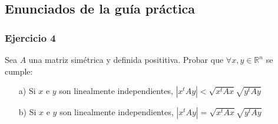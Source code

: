 \subsection{Enunciados de la guía práctica}\label{subsec:enunciados_guia_3_sdp}

\subsubsection{Ejercicio 4}\label{subsubsec:guia_4_ej_4}

Sea $A$ una matriz simétrica y definida posititiva. Probar que $\forall x, y \in \mathbb{R}^{n}$ se cumple:

\begin{itemize}
    \item[a)] Si $x$ e $y$ son linealmente independientes, $|x^{t}Ay| < \sqrt{x^{t}Ax}\sqrt{y^{t}Ay}$
    \item[b)] Si $x$ e $y$ son linealmente independientes, $|x^{t}Ay| = \sqrt{x^{t}Ax}\sqrt{y^{t}Ay}$
\end{itemize}
